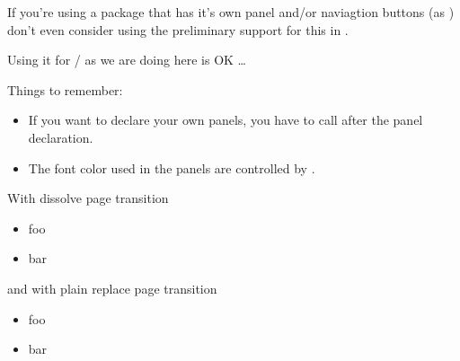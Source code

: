 \documentclass[calcdimensions,landscape,letterpaper,KOMA]{powersem}
\newcommand{\MyHeader}{}
\newcommand{\myheader}[1]{\renewcommand{\MyHeader}{#1}}
\begin{document}
\begin{slide}

\myheader{Just some info about panels}

If you're using a package that has it's own panel and/or naviagtion buttons (as
\href{ftp://ftp.dante.de/tex-archive/help/Catalogue/entries/pdfscreen.html}%
{}) don't even consider using the preliminary support for this
in .

Using it for  /  as we are doing here is OK \dots

Things to remember:
\begin{itemize}
\item If you want to declare your own panels, you have to call
 after the panel declaration.
\item The font color used in the panels are controlled by .
\end{itemize}

\newslide

\myheader{Some examples for \macroname{pause}}

\pageTransitionDissolve
With dissolve page transition
\begin{itemize}
\item foo\pause
\item bar\pause
\end{itemize}
\pageTransitionReplace
and with plain replace page transition
\begin{itemize}
\item foo\pause
\item bar\pause
\end{itemize}

\end{slide}
\end{document}
